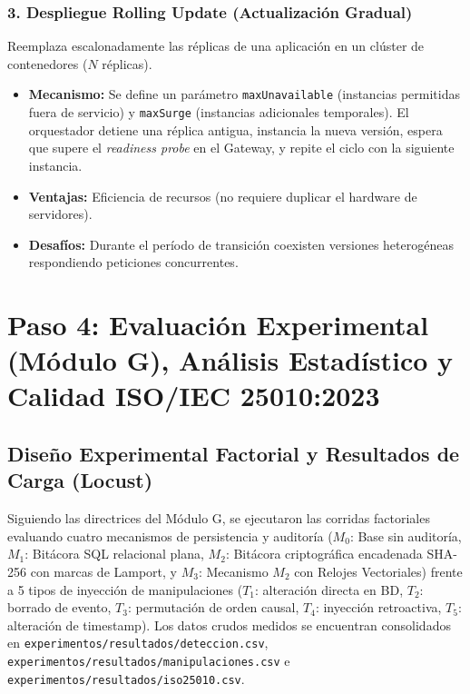 \documentclass[11pt,a4paper]{article}
\begin{document}
\subsubsection{3. Despliegue Rolling Update (Actualizaci\'on Gradual)}
Reemplaza escalonadamente las r\'eplicas de una aplicaci\'on en un cl\'uster de contenedores ($N$ r\'eplicas).
\begin{itemize}[noitemsep]
  \item \textbf{Mecanismo:} Se define un par\'ametro \texttt{maxUnavailable} (instancias permitidas fuera de servicio) y \texttt{maxSurge} (instancias adicionales temporales). El orquestador detiene una r\'eplica antigua, instancia la nueva versi\'on, espera que supere el \emph{readiness probe} en el Gateway, y repite el ciclo con la siguiente instancia.
  \item \textbf{Ventajas:} Eficiencia de recursos (no requiere duplicar el hardware de servidores).
  \item \textbf{Desaf\'ios:} Durante el per\'iodo de transici\'on coexisten versiones heterog\'eneas respondiendo peticiones concurrentes.
\end{itemize}

\section{Paso 4: Evaluaci\'on Experimental (M\'odulo G), An\'alisis Estad\'istico y Calidad ISO/IEC 25010:2023}

\subsection{Dise\~no Experimental Factorial y Resultados de Carga (Locust)}
Siguiendo las directrices del M\'odulo G, se ejecutaron las corridas factoriales evaluando cuatro mecanismos de persistencia y auditor\'ia ($M_0$: Base sin auditor\'ia, $M_1$: Bit\'acora SQL relacional plana, $M_2$: Bit\'acora criptogr\'afica encadenada SHA-256 con marcas de Lamport, y $M_3$: Mecanismo $M_2$ con Relojes Vectoriales) frente a 5 tipos de inyecci\'on de manipulaciones ($T_1$: alteraci\'on directa en BD, $T_2$: borrado de evento, $T_3$: permutaci\'on de orden causal, $T_4$: inyecci\'on retroactiva, $T_5$: alteraci\'on de timestamp). Los datos crudos medidos se encuentran consolidados en \texttt{experimentos/resultados/deteccion.csv}, \texttt{experimentos/resultados/manipulaciones.csv} e \texttt{experimentos/resultados/iso25010.csv}.
\end{document}
